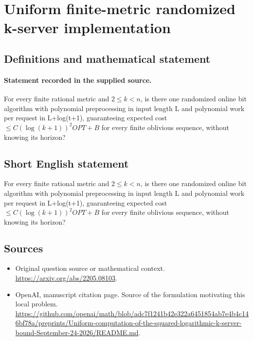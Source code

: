 \documentclass[11pt]{article}
\begin{document}
\section*{Uniform finite-metric randomized k-server implementation}\label{statement}
\subsection{Definitions and mathematical statement}
\paragraph{Statement recorded in the supplied source.}
For every finite rational metric and $2\leq k<n$, is there one randomized online bit algorithm with polynomial preprocessing in input length L and polynomial work per request in L+log(t+1), guaranteeing expected cost $\leq C(\log (k+1))^{2}OPT+B$ for every finite oblivious sequence, without knowing its horizon?
\subsection{Short English statement}
For every finite rational metric and $2\leq k<n$, is there one randomized online bit algorithm with polynomial preprocessing in input length L and polynomial work per request in L+log(t+1), guaranteeing expected cost $\leq C(\log (k+1))^{2}OPT+B$ for every finite oblivious sequence, without knowing its horizon?
\subsection{Sources}
\begin{itemize}
\item[S1] Original question source or mathematical context.
\url{https://arxiv.org/abs/2205.08103}.
\item[S2] OpenAI, manuscript citation page. Source of the formulation motivating this local problem.
\url{https://github.com/openai/math/blob/adc7f1241b42e322a6451854ab7e4b4c146bf78a/preprints/Uniform-computation-of-the-squared-logarithmic-k-server-bound-September-24-2026/README.md}.
\end{itemize}
\end{document}
